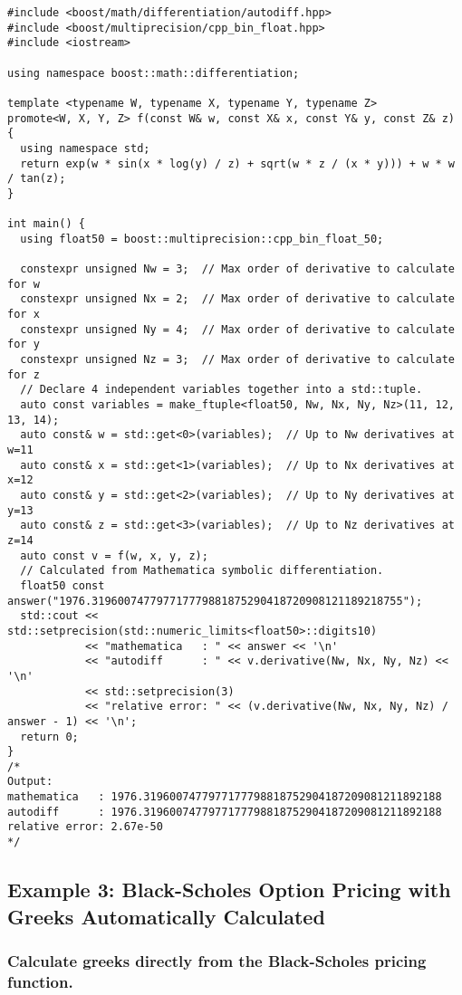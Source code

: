 \documentclass{article}
\begin{document}
\begin{verbatim}
#include <boost/math/differentiation/autodiff.hpp>
#include <boost/multiprecision/cpp_bin_float.hpp>
#include <iostream>

using namespace boost::math::differentiation;

template <typename W, typename X, typename Y, typename Z>
promote<W, X, Y, Z> f(const W& w, const X& x, const Y& y, const Z& z) {
  using namespace std;
  return exp(w * sin(x * log(y) / z) + sqrt(w * z / (x * y))) + w * w / tan(z);
}

int main() {
  using float50 = boost::multiprecision::cpp_bin_float_50;

  constexpr unsigned Nw = 3;  // Max order of derivative to calculate for w
  constexpr unsigned Nx = 2;  // Max order of derivative to calculate for x
  constexpr unsigned Ny = 4;  // Max order of derivative to calculate for y
  constexpr unsigned Nz = 3;  // Max order of derivative to calculate for z
  // Declare 4 independent variables together into a std::tuple.
  auto const variables = make_ftuple<float50, Nw, Nx, Ny, Nz>(11, 12, 13, 14);
  auto const& w = std::get<0>(variables);  // Up to Nw derivatives at w=11
  auto const& x = std::get<1>(variables);  // Up to Nx derivatives at x=12
  auto const& y = std::get<2>(variables);  // Up to Ny derivatives at y=13
  auto const& z = std::get<3>(variables);  // Up to Nz derivatives at z=14
  auto const v = f(w, x, y, z);
  // Calculated from Mathematica symbolic differentiation.
  float50 const answer("1976.319600747797717779881875290418720908121189218755");
  std::cout << std::setprecision(std::numeric_limits<float50>::digits10)
            << "mathematica   : " << answer << '\n'
            << "autodiff      : " << v.derivative(Nw, Nx, Ny, Nz) << '\n'
            << std::setprecision(3)
            << "relative error: " << (v.derivative(Nw, Nx, Ny, Nz) / answer - 1) << '\n';
  return 0;
}
/*
Output:
mathematica   : 1976.3196007477977177798818752904187209081211892188
autodiff      : 1976.3196007477977177798818752904187209081211892188
relative error: 2.67e-50
*/
\end{verbatim}

\subsection{Example 3: Black-Scholes Option Pricing with Greeks Automatically Calculated}
\subsubsection{Calculate greeks directly from the Black-Scholes pricing function.}
\end{document}
